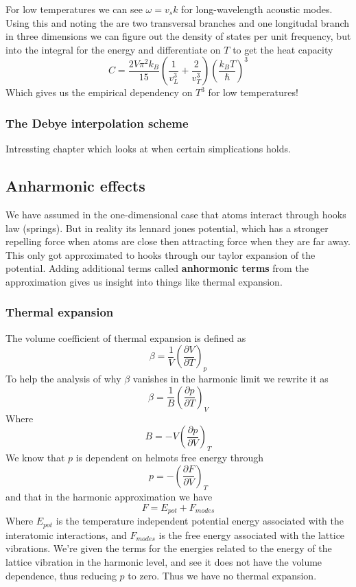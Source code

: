 \documentclass[11pt]{article}
\begin{document}
For low temperatures we can see $\omega = v_s k$ for long-wavelength acoustic modes. Using this and noting the are two transversal branches and one longitudal branch in three dimensions we can figure out the density of states per unit frequency, but into the integral for the energy and differentiate on $T$ to get the heat capacity 
\begin{equation}
	C = \frac{2V\pi^2 k_B}{15} (\frac{1}{v_L^3} + \frac{2}{v_T^3}) (\frac{k_B T}{\hslash})^3
\end{equation}
Which gives us the empirical dependency on $T^3$ for low temperatures!
\subsubsection{The Debye interpolation scheme}
Intressting chapter which looks at when certain simplications holds.

\subsection{Anharmonic effects}
We have assumed in the one-dimensional case that atoms interact through hooks law (springs). But in reality its lennard jones potential, which has a stronger repelling force when atoms are close then attracting force when they are far away. This only got approximated to hooks through our taylor expansion of the potential. Adding additional terms called \textbf{anhormonic terms} from the approximation gives us insight into things like thermal expansion. 

\subsubsection{Thermal expansion}
The volume coefficient of thermal expansion is defined as
\begin{equation}
	\beta = \frac{1}{V} (\frac{\partial V}{\partial T})_p
\end{equation}
To help the analysis of why $\beta$ vanishes in the harmonic limit we rewrite it as
\begin{equation}
	\beta = \frac{1}{B} (\frac{\partial p}{\partial T})_V
\end{equation}
Where 
\begin{equation}
	B = - V (\frac{\partial p }{\partial V})_T
\end{equation}
We know that $p$ is dependent on helmots free energy through
\begin{equation}
	p = - (\frac{\partial F}{\partial V})_T
\end{equation}
and that in the harmonic approximation we have
\begin{equation}
	F = E_{pot} + F_{modes}
\end{equation}
Where $E_{pot}$ is the temperature independent potential energy associated with the interatomic interactions, and $F_{modes}$ is the free energy associated with the lattice vibrations.  We're given the terms for the energies related to the energy of the lattice vibration in the harmonic level, and see it does not have the volume dependence, thus reducing $p$ to zero. Thus we have no thermal expansion. 
\end{document}
